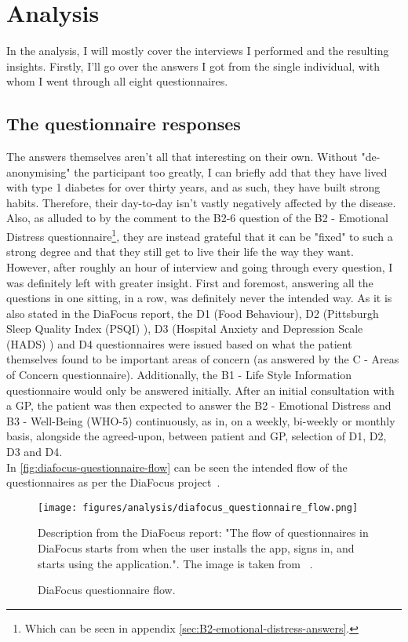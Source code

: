 \section{Analysis}
In the analysis, I will mostly cover the interviews I performed and the resulting insights. Firstly, I'll go over the answers I got from the single individual, with whom I went through all eight questionnaires. 

\subsection{The questionnaire responses}
The answers themselves aren't all that interesting on their own. Without "de-anonymising" the participant too greatly, I can briefly add that they have lived with type 1 diabetes for over thirty years, and as such, they have built strong habits. Therefore, their day-to-day isn't vastly negatively affected by the disease. Also, as alluded to by the comment to the B2-6 question of the B2 - Emotional Distress questionnaire\footnote{Which can be seen in appendix \autoref{sec:B2-emotional-distress-answers}.}, they are instead grateful that it can be "fixed" to such a strong degree and that they still get to live their life the way they want.
\\
However, after roughly an hour of interview and going through every question, I was definitely left with greater insight. First and foremost, answering all the questions in one sitting, in a row, was definitely never the intended way. As it is also stated in the DiaFocus report, the D1 (Food Behaviour), D2 (Pittsburgh Sleep Quality Index (PSQI) ), D3 (Hospital Anxiety and Depression Scale (HADS) ) and D4 questionnaires were issued based on what the patient themselves found to be important areas of concern (as answered by the C - Areas of Concern questionnaire). Additionally, the B1 - Life Style Information questionnaire would only be answered initially. After an initial consultation with a GP, the patient was then expected to answer the B2 - Emotional Distress and B3 - Well-Being (WHO-5) continuously, as in, on a weekly, bi-weekly or monthly basis, alongside the agreed-upon, between patient and GP, selection of D1, D2, D3 and D4.
\\
In \autoref{fig:diafocus-questionnaire-flow} can be seen the intended flow of the questionnaires as per the DiaFocus project~\cite{DiaFocus}.

\begin{figure}[H]
    \centering
    \texttt{[image: figures/analysis/diafocus\_questionnaire\_flow.png]}
    \caption{DiaFocus questionnaire flow.}
    \medskip
    \small
    \raggedright
    Description from the DiaFocus report: "The flow of questionnaires in DiaFocus starts from when the user installs the app, signs in, and starts using the application.". The image is taken from ~\cite{DiaFocus}.
    \label{fig:diafocus-questionnaire-flow}
\end{figure}

